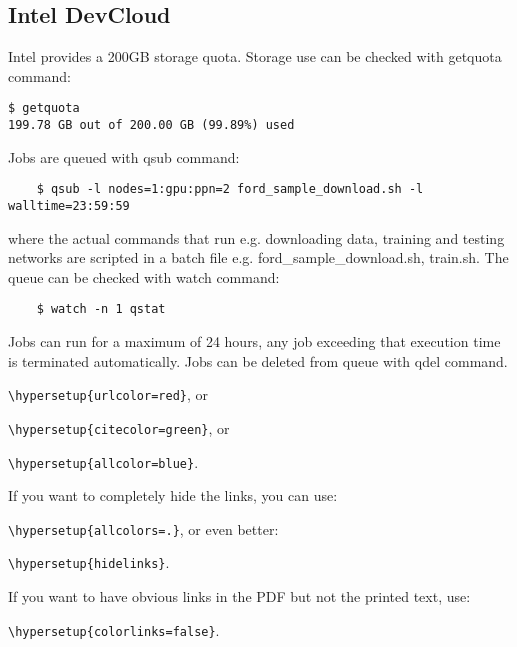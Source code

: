 \subsection{Intel DevCloud}

Intel provides a 200GB storage quota. Storage use can be checked with getquota command:
\begin{verbatim}
$ getquota
199.78 GB out of 200.00 GB (99.89%) used   
\end{verbatim}
Jobs are queued with qsub command:
\begin{verbatim}
    $ qsub -l nodes=1:gpu:ppn=2 ford_sample_download.sh -l walltime=23:59:59
\end{verbatim}
where the actual commands that run e.g. downloading data, training and testing networks are scripted in a batch file e.g. ford\_sample\_download.sh, train.sh.   
The queue can be checked with watch command:
\begin{verbatim}
    $ watch -n 1 qstat
\end{verbatim}
Jobs can run for a maximum of 24 hours, any job exceeding that execution time is terminated automatically. Jobs can be deleted from queue with qdel command.


{\small\verb!\hypersetup{urlcolor=red}!}, or

{\small\verb!\hypersetup{citecolor=green}!}, or

{\small\verb!\hypersetup{allcolor=blue}!}.

\noindent If you want to completely hide the links, you can use:

{\small\verb!\hypersetup{allcolors=.}!}, or even better: 

{\small\verb!\hypersetup{hidelinks}!}.

\noindent If you want to have obvious links in the PDF but not the printed text, use:

{\small\verb!\hypersetup{colorlinks=false}!}.
